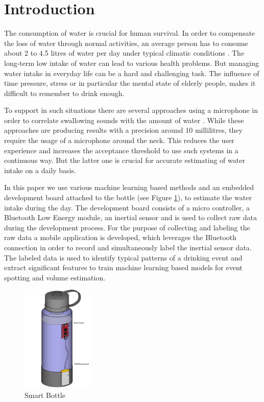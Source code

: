 \section{Introduction}
The consumption of water is crucial for human survival. In order to compensate the loss of water through normal activities, an average person has to consume about 2 to 4.5 litres of water per day under typical climatic conditions \cite{doi:10.1080/02508069608686494}. The long-term low intake of water can lead to various health problems. But managing water intake in everyday life can be a hard and challenging task. The influence of time pressure, stress or in particular the mental state of elderly people, makes it difficult to remember to drink enough.

To support in such situations there are several approaches using a microphone in order to correlate swallowing sounds with the amount of water \cite{7031280,8229307}. While these approaches are producing results with a precision around 10 millilitres, they require the usage of a microphone around the neck. This reduces the user experience and increases the acceptance threshold to use such systems in a continuous way. But the latter one is crucial for accurate estimating of water intake on a daily basis.

In this paper we use various machine learning based methods and an embedded development board attached to the bottle (see Figure \ref{fig:bottle}), to estimate the water intake during the day. The development board consists of a micro controller, a Bluetooth Low Energy module, an inertial sensor and is used to collect raw data during the development process. For the purpose of collecting and labeling the raw data a mobile application is developed, which leverages the Bluetooth connection in order to record and simultaneously label the inertial sensor data. The labeled data is used to identify typical patterns of a drinking event and extract significant features to train machine learning based models for event spotting and volume estimation.

\begin{figure}
\label{fig:bottle}
\centering
  \includegraphics[width=0.3\textwidth]{assets/SmartBottle.png}
\caption{Smart Bottle}
\end{figure}